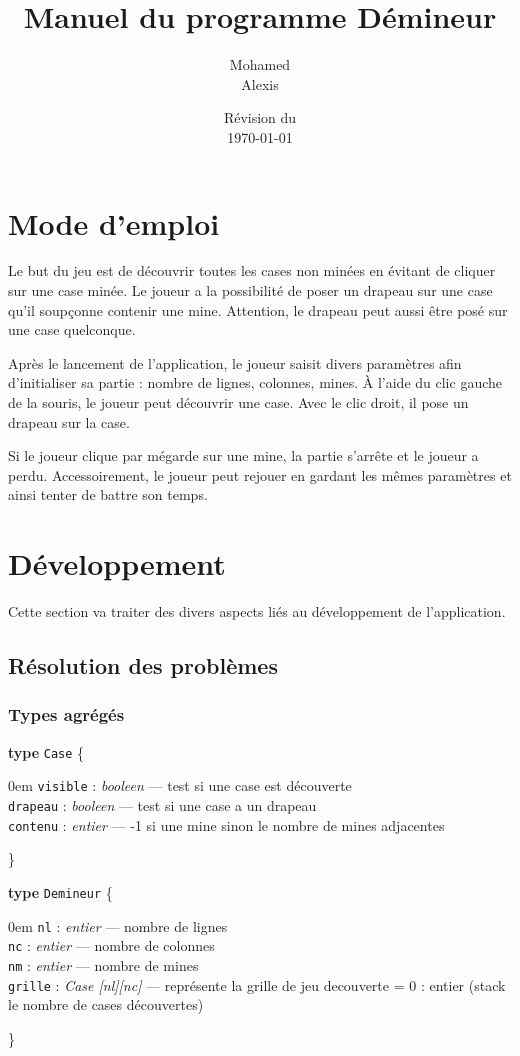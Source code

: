 \documentclass[a4paper, 12pt, oneside]{article}
\title{Manuel du programme Démineur}
\author{Mohamed \bsc{Lakhal}\\Alexis \bsc{Cabodi}}
\date{Révision du\\\today}
\newenvironment{typeag}[1][]{\noindent \textbf{type} \texttt{#1} \{\begin{addmargin}[2em]{0em}}{\end{addmargin}\}}
\newcommand{\variable}[3]{\noindent \texttt{#1} : \textit{#2} --- #3}
\begin{document}
\maketitle
\newpage
\tableofcontents
\newpage

\section{Mode d'emploi}
Le but du jeu est de découvrir toutes les cases non minées en évitant de cliquer sur une case minée. Le joueur a la possibilité de poser un drapeau sur une case qu'il soupçonne contenir une mine. Attention, le drapeau peut aussi être posé sur une case quelconque.
\bigskip

Après le lancement de l'application, le joueur saisit divers paramètres afin d'initialiser sa partie : nombre de lignes, colonnes, mines.
À l'aide du clic gauche de la souris, le joueur peut découvrir une case. Avec le clic droit, il pose un drapeau sur la case.
\bigskip

Si le joueur clique par mégarde sur une mine, la partie s'arrête et le joueur a perdu.
Accessoirement, le joueur peut rejouer en gardant les mêmes paramètres et ainsi tenter de battre son temps.
\newpage
\section{Développement}
Cette section va traiter des divers aspects liés au développement de l'application.
\subsection{Résolution des problèmes}

\subsubsection{Types agrégés}

\smallskip
\begin{typeag}[Case]
	\variable{visible}{booleen}{test si une case est découverte} \\
	\variable{drapeau}{booleen}{test si une case a un drapeau} \\
	\variable{contenu}{entier}{-1 si une mine sinon le nombre de mines adjacentes}
\end{typeag}

\begin{typeag}[Demineur]
	\variable{nl}{entier}{nombre de lignes} \\
	\variable{nc}{entier}{nombre de colonnes} \\
	\variable{nm}{entier}{nombre de mines} \\
	\variable{grille}{Case [nl][nc]}{représente la grille de jeu}
	decouverte = 0 : entier (stack le nombre de cases découvertes)
\end{typeag}\smallskip
\end{document}
